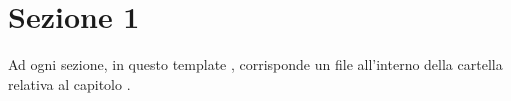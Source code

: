 \section{Sezione 1}
Ad ogni sezione, in questo template \cite{UsabilityFirst}, corrisponde un file all'interno della cartella relativa al capitolo \cite{Bolognani-Zigliotto}.